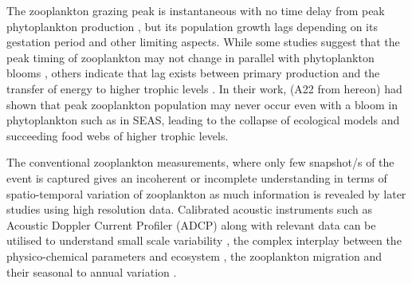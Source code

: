 \documentclass{article}
\begin{document}
	The zooplankton grazing peak is instantaneous with no time delay from peak phytoplankton production \citep{li2000determines,barber2001qn}, but its population growth lags \citep{rehim2012dynamical, almen2020temperature} depending on its gestation period and other limiting aspects. While some studies suggest that the peak timing of zooplankton may not change in parallel with phytoplankton blooms \citep{winder2004climatic}, others indicate that lag exists between primary production and the transfer of energy to higher trophic levels \citep{brock1992interannual, brock1991phytoplankton}. In their work, \citet{aparna2022seasonal} (A22 from hereon) had shown that peak zooplankton population may never occur even with a bloom in phytoplankton such as in SEAS, leading to the collapse of ecological models and succeeding food webs of higher trophic levels.  
	
	The conventional zooplankton measurements, where only few snapshot/s of the event is captured gives an incoherent or incomplete understanding in terms of spatio-temporal variation of zooplankton \citep{ramamurthy1965studies, piontkovski1995spatial, madhupratap1992zooplankton,madhupratap1996lack,wishner1998mesozooplankton,kidwai2000dd,barber2001qn,khandagale2022seasonal} as much information is revealed by later studies \citep{jyothibabu2010re, vijith2016consequences, shankar2019role, aparna2022seasonal} using high resolution data. Calibrated acoustic instruments such as Acoustic Doppler Current Profiler (ADCP) along with relevant data can be utilised to understand small scale variability \citep{nair1999arabian, edvardsen2003assessing, smith2005mesozooplankton, smeti2015spatial, kang2024acoustic}, the complex interplay between the physico-chemical parameters and ecosystem \citep{jiang2007temporal, potiris2018acoustic, shankar2019role, aparna2022seasonal, nie2023influence}, the zooplankton migration \citep{inoue2016diel,ursella2018evidence, ursella2021diel} and their seasonal to annual variation \citep{jiang2007temporal, hobbs2021marine,liu2022seasonal, aparna2022seasonal}.
	
\end{document}
